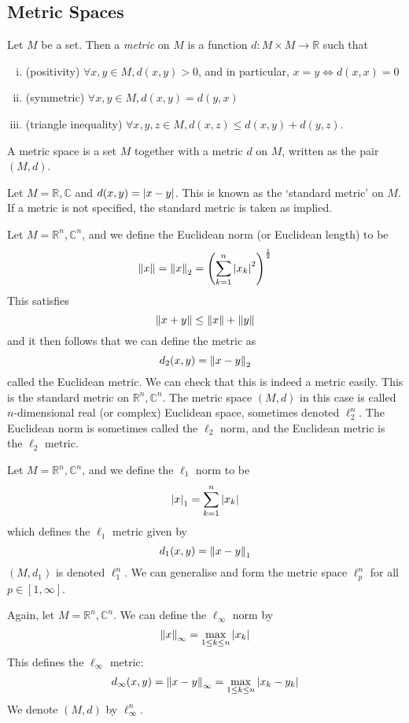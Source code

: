 \subsection{Metric Spaces}
\begin{definition}
Let \( M \) be a set.
Then a \textit{metric} on \( M \) is a function \( d \colon M \times M \to \mathbb R \) such that
\begin{enumerate}[(i)]
\item (positivity) \( \forall x,y \in M, d(x,y) > 0 \), and in particular, \( x = y \iff d(x,x) = 0 \)
\item (symmetric) \( \forall x,y \in M, d(x,y) = d(y,x) \)
\item (triangle inequality) \( \forall x,y,z \in M, d(x,z) \leq d(x,y) + d(y,z) \).
\end{enumerate}
A metric space is a set \( M \) together with a metric \( d \) on \( M \), written as the pair \( (M, d) \).
\end{definition}
\begin{example}
Let \( M = \mathbb R, \mathbb C \) and \( d(x,y) = \abs{x-y} \).
This is known as the `standard metric' on \( M \).
If a metric is not specified, the standard metric is taken as implied.
\end{example}
\begin{example}
Let \( M = \mathbb R^n, \mathbb C^n \), and we define the Euclidean norm (or Euclidean length) to be
\[ \norm{x} = \norm{x}_2 = \qty(\sum_{k=1}^n \abs{x_k}^2)^{\frac{1}{2}} \]
This satisfies
\[ \norm{x+y} \leq \norm{x} + \norm{y} \]
and it then follows that we can define the metric as
\[ d_2(x,y) = \norm{x-y}_2 \]
called the Euclidean metric.
We can check that this is indeed a metric easily.
This is the standard metric on \( \mathbb R^n, \mathbb C^n \).
The metric space \( (M, d) \) in this case is called \( n \)-dimensional real (or complex) Euclidean space, sometimes denoted \( \ell_2^n \).
The Euclidean norm is sometimes called the \( \ell_2 \) norm, and the Euclidean metric is the \( \ell_2 \) metric.
\end{example}
\begin{example}
Let \( M = \mathbb R^n, \mathbb C^n \), and we define the \( \ell_1 \) norm to be
\[ \abs{x}_1 = \sum_{k=1}^n \abs{x_k} \]
which defines the \( \ell_1 \) metric given by
\[ d_1(x,y) = \norm{x-y}_1 \]
\( (M, d_1) \) is denoted \( \ell_1^n \).
We can generalise and form the metric space \( \ell_p^n \) for all \( p \in [1, \infty] \).
\end{example}
\begin{example}
Again, let \( M = \mathbb R^n, \mathbb C^n \).
We can define the \( \ell_\infty \) norm by
\[ \norm{x}_\infty = \max_{1 \leq k \leq n} \abs{x_k} \]
This defines the \( \ell_\infty \) metric:
\[ d_\infty(x,y) = \norm{x-y}_\infty = \max_{1 \leq k \leq n} \abs{x_k - y_k} \]
We denote \( (M, d) \) by \( \ell_\infty^n \).
\end{example}
